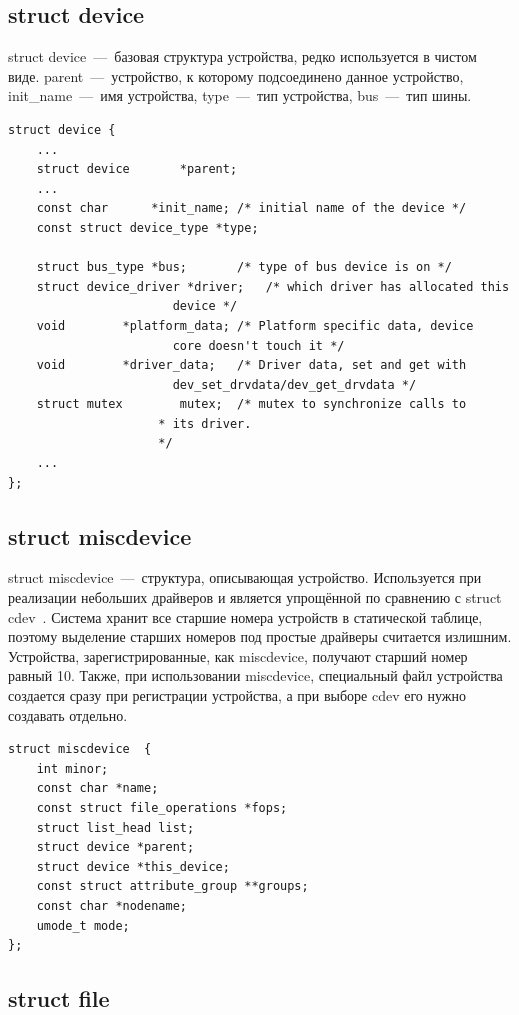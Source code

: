 \subsection{struct device}

struct device~---~базовая структура устройства, редко используется в чистом виде. parent~---~устройство, к которому подсоединено данное устройство, init\_name~---~имя устройства, type~---~тип устройства, bus~---~тип шины.

\begin{lstlisting}[label=struct_device,caption=struct device]
struct device {
	...
	struct device		*parent;
	...
	const char		*init_name; /* initial name of the device */
	const struct device_type *type;

	struct bus_type	*bus;		/* type of bus device is on */
	struct device_driver *driver;	/* which driver has allocated this
					   device */
	void		*platform_data;	/* Platform specific data, device
					   core doesn't touch it */
	void		*driver_data;	/* Driver data, set and get with
					   dev_set_drvdata/dev_get_drvdata */
	struct mutex		mutex;	/* mutex to synchronize calls to
					 * its driver.
					 */
	...
};
\end{lstlisting}

\subsection{struct miscdevice}

struct miscdevice~---~структура, описывающая устройство. Используется при реализации небольших драйверов и является упрощённой по сравнению с struct cdev~\cite{bib8}. Система хранит все старшие номера устройств в статической таблице, поэтому выделение старших номеров под простые драйверы считается излишним. Устройства, зарегистрированные, как miscdevice, получают старший номер равный 10. Также, при использовании miscdevice, специальный файл устройства создается сразу при регистрации устройства, а при выборе cdev его нужно создавать отдельно.

\begin{lstlisting}[label=struct_miscdevice,caption=struct miscdevice]
struct miscdevice  {
	int minor;
	const char *name;
	const struct file_operations *fops;
	struct list_head list;
	struct device *parent;
	struct device *this_device;
	const struct attribute_group **groups;
	const char *nodename;
	umode_t mode;
};
\end{lstlisting}

\subsection{struct file}

